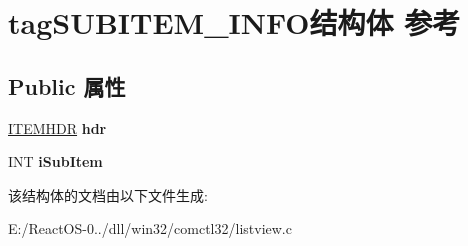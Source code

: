 \hypertarget{structtag_s_u_b_i_t_e_m___i_n_f_o}{}\section{tag\+S\+U\+B\+I\+T\+E\+M\+\_\+\+I\+N\+F\+O结构体 参考}
\label{structtag_s_u_b_i_t_e_m___i_n_f_o}
\subsection*{Public 属性}
\begin{DoxyCompactItemize}
\item 
\mbox{\label{structtag_s_u_b_i_t_e_m___i_n_f_o_a38c47d7d3811f118c36a9ebd8bae18f7}} 
\hyperlink{structtag_i_t_e_m_h_d_r}{I\+T\+E\+M\+H\+DR} {\bfseries hdr}
\item 
\mbox{\label{structtag_s_u_b_i_t_e_m___i_n_f_o_a316a0be6926a2b3566d891d9dd62079e}} 
I\+NT {\bfseries i\+Sub\+Item}
\end{DoxyCompactItemize}


该结构体的文档由以下文件生成\+:\begin{DoxyCompactItemize}
\item 
E\+:/\+React\+O\+S-\/0../dll/win32/comctl32/listview.\+c\end{DoxyCompactItemize}
